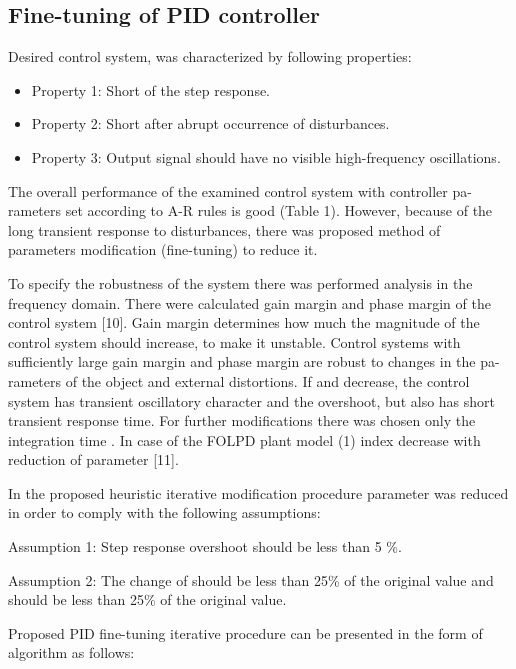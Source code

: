\documentclass{amcs}
\begin{document}
\subsection{Fine-tuning of PID controller}

Desired control system, was characterized by following properties:

\begin{itemize}
\item Property 1: Short   of the step response.
\item Property 2: Short   after abrupt occurrence of disturbances.
\item Property 3: Output signal should have no visible high-frequency oscillations.
\end{itemize}

The overall performance of the examined control system with controller pa-rameters set according to A-R rules is good (Table 1). However, because of the long transient response to disturbances, there was proposed method of parameters modification (fine-tuning) to reduce it.

To specify the robustness of the system there was performed analysis in the frequency domain. There were calculated gain margin   and phase margin  of the control system [10]. Gain margin determines how much the magnitude of the control system should increase, to make it unstable. Control systems with sufficiently large gain margin and phase margin are robust to changes in the pa-rameters of the object and external distortions. If   and   decrease, the control system has transient oscillatory character and the overshoot, but also has short transient response time. For further modifications there was chosen only the integration time  . In case of the FOLPD plant model (1) index   decrease with reduction of parameter [11]. 

In the proposed heuristic iterative modification procedure parameter   was reduced in order to comply with the following assumptions:

Assumption 1: Step response overshoot should be less than 5 \%.

Assumption 2: The change of   should be less than 25\% of the original value and   should be less than 25\% of the original value. 

Proposed PID fine-tuning iterative procedure can be presented in the form of algorithm as follows:
\end{document}
